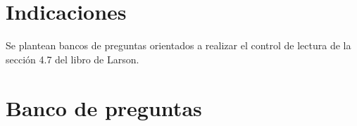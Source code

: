 \documentclass[a4,11pt]{aleph-notas}
\begin{document}
\encabezado

\vspace*{-8mm}
\tableofcontents

\section{Indicaciones}

Se plantean bancos de preguntas orientados a realizar el control de lectura de la sección 4.7 del libro de Larson.

\section{Banco de preguntas}
\end{document}
